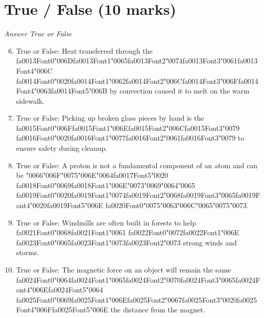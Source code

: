 \documentclass[12pt]{article}
\begin{document}
\section*{True / False (10 marks)}
\textit{Answer True or False}
\begin{enumerate}[label=\arabic*.]
\setcounter{enumi}{5}
\item True or False: Heat transferred through the {\csname fa0013Font0\endcsname\char"006D}{\csname fa0013Font1\endcsname\char"0065}{\csname fa0013Font2\endcsname\char"0074}{\csname fa0013Font3\endcsname\char"0061}{\csname fa0013Font4\endcsname\char"006C} {\csname fa0014Font0\endcsname\char"0020}{\csname fa0014Font1\endcsname\char"0062}{\csname fa0014Font2\endcsname\char"006C}{\csname fa0014Font3\endcsname\char"006F}{\csname fa0014Font4\endcsname\char"0063}{\csname fa0014Font5\endcsname\char"006B} by convection caused it to melt on the warm sidewalk.
\item True or False: Picking up broken glass pieces by hand is the {\csname fa0015Font0\endcsname\char"006F}{\csname fa0015Font1\endcsname\char"006E}{\csname fa0015Font2\endcsname\char"006C}{\csname fa0015Font3\endcsname\char"0079} {\csname fa0016Font0\endcsname\char"0020}{\csname fa0016Font1\endcsname\char"0077}{\csname fa0016Font2\endcsname\char"0061}{\csname fa0016Font3\endcsname\char"0079} to ensure safety during cleanup.
\item True or False: A proton is not a fundamental component of an atom and can be {\char"0066}{\char"006F}{\char"0075}{\char"006E}{\char"0064}{\csname fa0017Font5\endcsname\char"0020} {\csname fa0018Font0\endcsname\char"0069}{\csname fa0018Font1\endcsname\char"006E}{\char"0073}{\char"0069}{\char"0064}{\char"0065} {\csname fa0019Font0\endcsname\char"0020}{\csname fa0019Font1\endcsname\char"0074}{\csname fa0019Font2\endcsname\char"0068}{\csname fa0019Font3\endcsname\char"0065}{\csname fa0019Font4\endcsname\char"0020}{\csname fa0019Font5\endcsname\char"006E} {\csname fa0020Font0\endcsname\char"0075}{\char"0063}{\char"006C}{\char"0065}{\char"0075}{\char"0073}.
\item True or False: Windmills are often built in forests to help {\csname fa0021Font0\endcsname\char"0068}{\csname fa0021Font1\endcsname\char"0061} {\csname fa0022Font0\endcsname\char"0072}{\csname fa0022Font1\endcsname\char"006E} {\csname fa0023Font0\endcsname\char"0065}{\csname fa0023Font1\endcsname\char"0073}{\csname fa0023Font2\endcsname\char"0073} strong winds and storms.
\item True or False: The magnetic force on an object will remain the same {\csname fa0024Font0\endcsname\char"0064}{\csname fa0024Font1\endcsname\char"0065}{\csname fa0024Font2\endcsname\char"0070}{\csname fa0024Font3\endcsname\char"0065}{\csname fa0024Font4\endcsname\char"006E}{\csname fa0024Font5\endcsname\char"0064} {\csname fa0025Font0\endcsname\char"0069}{\csname fa0025Font1\endcsname\char"006E}{\csname fa0025Font2\endcsname\char"0067}{\csname fa0025Font3\endcsname\char"0020}{\csname fa0025Font4\endcsname\char"006F}{\csname fa0025Font5\endcsname\char"006E} the distance from the magnet.
\end{enumerate}
\end{document}
